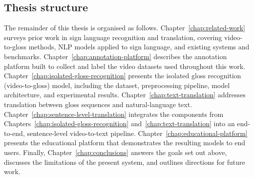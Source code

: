 \subsection{Thesis structure}
\label{sec:thesis-structure}

The remainder of this thesis is organised as follows.
Chapter~\ref{chap:related-work} surveys prior work in sign language recognition
and translation, covering video-to-gloss methods, NLP models applied to sign
language, and existing systems and benchmarks.
Chapter~\ref{chap:annotation-platform} describes the annotation platform built to
collect and label the video datasets used throughout this work.
Chapter~\ref{chap:isolated-gloss-recognition} presents the isolated gloss
recognition (video-to-gloss) model, including the dataset, preprocessing
pipeline, model architecture, and experimental results.
Chapter~\ref{chap:text-translation} addresses translation between gloss
sequences and natural-language text.
Chapter~\ref{chap:sentence-level-translation} integrates the components from
Chapters~\ref{chap:isolated-gloss-recognition} and~\ref{chap:text-translation}
into an end-to-end, sentence-level video-to-text pipeline.
Chapter~\ref{chap:educational-platform} presents the educational platform that
demonstrates the resulting models to end users.
Finally, Chapter~\ref{chap:conclusions} answers the goals set out above,
discusses the limitations of the present system, and outlines directions for
future work.
